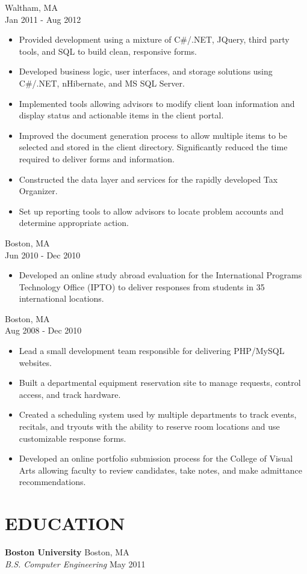 \documentclass{article}
\begin{document}
 \hfill Waltham, MA \\
 \hfill Jan 2011 - Aug 2012
\begin{itemize}
\item Provided development using a mixture of C\#/.NET, JQuery, third party tools, and SQL to build clean, responsive forms.
\item Developed business logic, user interfaces, and storage solutions using C\#/.NET, nHibernate, and MS SQL Server.
\item Implemented tools allowing advisors to modify client loan information and display status and actionable items in the client portal.
\item Improved the document generation process to allow multiple items to be selected and stored in the client directory. Significantly reduced the time required to deliver forms and information.
\item Constructed the data layer and services for the rapidly developed Tax Organizer.
\item Set up reporting tools to allow advisors to locate problem accounts and determine appropriate action.
\end{itemize}

 \hfill Boston, MA \\
 \hfill Jun 2010 - Dec 2010
\begin{itemize}
\item Developed an online study abroad evaluation for the International Programs Technology Office (IPTO) to deliver responses from students in 35 international locations.
\end{itemize}

 \hfill Boston, MA \\
 \hfill Aug 2008 - Dec 2010
\begin{itemize}
\item Lead a small development team responsible for delivering PHP/MySQL websites. 
\item Built a departmental equipment reservation site to manage requests, control access, and track hardware.
\item Created a scheduling system used by multiple departments to track events, recitals, and tryouts with the ability to reserve room locations and use customizable response forms.
\item Developed an online portfolio submission process for the College of Visual Arts allowing faculty to review candidates, take notes, and make admittance recommendations.
\end{itemize}

\section*{EDUCATION}

{\bf Boston University} \hfill Boston, MA \\
{\sl B.S. Computer Engineering} \hfill May 2011
\end{document}
